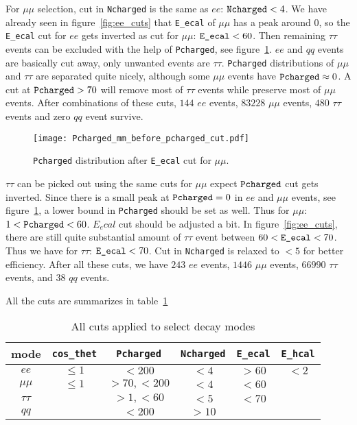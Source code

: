 For $\mu\mu$ selection, cut in \verb|Ncharged| is the same as $ee$: $\verb|Ncharged|< 4$. We have already seen in figure~\ref{fig:ee_cuts} that \verb|E_ecal| of $\mu\mu$ has a peak around $0$, so the \verb|E_ecal| cut for $ee$ gets inverted as cut for $\mu\mu$: $\verb|E_ecal| < 60$. Then remaining $\tau\tau$ events can be excluded with the help of \verb|Pcharged|, see figure~\ref{fig:mm_cuts}. $ee$ and $qq$ events are basically cut away, only unwanted events are $\tau\tau$. \verb|Pcharged| distributions of $\mu\mu$ and $\tau\tau$ are separated quite nicely, although some $\mu\mu$ events have $\verb|Pcharged| \approx 0$. A cut at $\verb|Pcharged| > 70$ will remove most of $\tau\tau$ events while preserve most of $\mu\mu$ events. After combinations of these cuts, $144$ $ee$ events, $83228$ $\mu\mu$ events, $480$ $\tau\tau$ events and zero $qq$ event survive.
\begin{figure}[ht]
	\centering
	\texttt{[image: Pcharged\_mm\_before\_pcharged\_cut.pdf]}
	\cprotect\caption{\verb|Pcharged| distribution after \verb|E_ecal| cut for $\mu\mu$.}%
	\label{fig:mm_cuts}
\end{figure}

$\tau\tau$ can be picked out using the same cuts for $\mu\mu$ expect $\verb|Pcharged|$ cut gets inverted. Since there is a small peak at $\verb|Pcharged| = 0$ in $ee$ and $\mu\mu$ events, see figure~\ref{fig:mm_cuts}, a lower bound in \verb|Pcharged| should be set as well. Thus for $\mu\mu$: $1< \verb|Pcharged| < 60$. $E_ecal$ cut should be adjusted a bit. In figure~\ref{fig:ee_cuts}, there are still quite substantial amount of $\tau\tau$ event between $60 < \verb|E_ecal| < 70$. Thus we have for $\tau\tau$: $\verb|E_ecal| < 70$. Cut in \verb|Ncharged| is relaxed to $<5$ for better efficiency. After all these cuts, we have $243$ $ee$ events, $1446$ $\mu\mu$ events, $66990$ $\tau\tau$ events, and $38$ $qq$ events.

All the cuts are summarizes in table~\ref{tab:cuts_all}
\begin{table}[ht]
	\centering
	\begin{tabular}{cccccc}
		\toprule
	mode & \verb|cos_thet| & \verb|Pcharged| & \verb|Ncharged| & \verb|E_ecal| & \verb|E_hcal| \\
	\midrule
	$ee$ & $\leq 1$ & $< 200$ & $< 4$ & $>60$ & $< 2$ \\
	$\mu\mu$ & $\leq 1$ & $>70, <200$ & $<4$ & $<60$ & \\
	$\tau\tau$ & & $>1, <60$ & $<5$ & $<70$ \\
	$qq$ & & $<200$ & $>10$ & & \\
	\bottomrule
	\end{tabular}
	\caption{All cuts applied to select decay modes}
	\label{tab:cuts_all}
\end{table}

